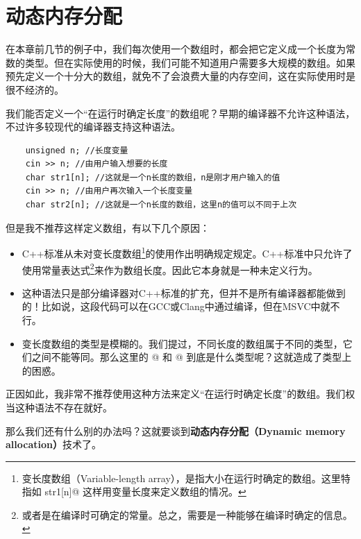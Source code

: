 \section{动态内存分配}
在本章前几节的例子中，我们每次使用一个数组时，都会把它定义成一个长度为常数的类型。但在实际使用的时候，我们可能不知道用户需要多大规模的数组。如果预先定义一个十分大的数组，就免不了会浪费大量的内存空间，这在实际使用时是很不经济的。\par
我们能否定义一个``在运行时确定长度''的数组呢？早期的编译器不允许这种语法，不过许多较现代的编译器支持这种语法。
\begin{lstlisting}
    unsigned n; //长度变量
    cin >> n; //由用户输入想要的长度
    char str1[n]; //这就是一个n长度的数组，n是刚才用户输入的值
    cin >> n; //由用户再次输入一个长度变量
    char str2[n]; //这就是一个n长度的数组，这里n的值可以不同于上次
\end{lstlisting}\par
但是我不推荐这样定义数组，有以下几个原因：
\begin{itemize}
    \item C++标准从未对变长度数组\footnote{变长度数组（Variable-length array），是指大小在运行时确定的数组。这里特指如 \lstinline@char str1[n]@ 这样用变量长度来定义数组的情况。}的使用作出明确规定规定。C++标准中只允许了使用常量表达式\footnote{或者是在编译时可确定的常量。总之，需要是一种能够在编译时确定的信息。}来作为数组长度。因此它本身就是一种未定义行为。
    \item 这种语法只是部分编译器对C++标准的扩充，但并不是所有编译器都能做到的！比如说，这段代码可以在GCC或Clang中通过编译，但在MSVC中就不行。
    \item 变长度数组的类型是模糊的。我们提过，不同长度的数组属于不同的类型，它们之间不能等同。那么这里的 @ 和 @ 到底是什么类型呢？这就造成了类型上的困惑。
\end{itemize}
正因如此，我非常不推荐使用这种方法来定义``在运行时确定长度''的数组。我们权当这种语法不存在就好。\par
那么我们还有什么别的办法吗？这就要谈到\textbf{动态内存分配（Dynamic memory allocation）}技术了。\par
